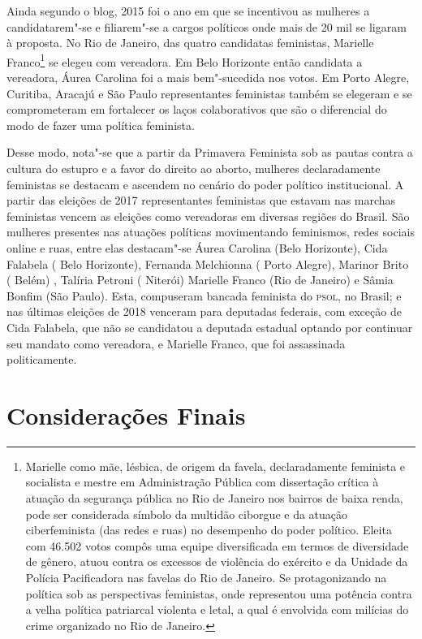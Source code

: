 Ainda segundo o blog, 2015 foi o ano em que se incentivou as mulheres a
candidatarem"-se e filiarem"-se a cargos políticos onde mais de 20 mil se
ligaram à proposta. No Rio de Janeiro, das quatro candidatas feministas,
Marielle Franco\footnote{Marielle como mãe, lésbica, de origem da
  favela, declaradamente feminista e socialista e mestre em
  Administração Pública com dissertação crítica à atuação da segurança
  pública no Rio de Janeiro nos bairros de baixa renda, pode ser
  considerada símbolo da multidão ciborgue e da atuação ciberfeminista
  (das redes e ruas) no desempenho do poder político. Eleita com 46.502
  votos compôs uma equipe diversificada em termos de diversidade de
  gênero, atuou contra os excessos de violência do exército e da Unidade
  da Polícia Pacificadora nas favelas do Rio de Janeiro. Se
  protagonizando na política sob as perspectivas feministas, onde
  representou uma potência contra a velha política patriarcal violenta e
  letal, a qual é envolvida com milícias do crime organizado no Rio de
  Janeiro.} se elegeu com vereadora. Em Belo Horizonte então candidata a
vereadora, Áurea Carolina foi a mais bem"-sucedida nos votos. Em Porto
Alegre, Curitiba, Aracajú e São Paulo representantes feministas também
se elegeram e se comprometeram em fortalecer os laços colaborativos que
são o diferencial do modo de fazer uma política feminista.

Desse modo, nota"-se que a partir da Primavera Feminista sob as pautas
contra a cultura do estupro e a favor do direito ao aborto, mulheres
declaradamente feministas se destacam e ascendem no cenário do poder
político institucional. A partir das eleições de 2017 representantes
feministas que estavam nas marchas feministas vencem as eleições como
vereadoras em diversas regiões do Brasil. São mulheres presentes nas
atuações políticas movimentando feminismos, redes sociais online e ruas,
entre elas destacam"-se Áurea Carolina (Belo Horizonte), Cida Falabela (
Belo Horizonte), Fernanda Melchionna ( Porto Alegre), Marinor Brito (
Belém) , Talíria Petroni ( Niterói) Marielle Franco (Rio de Janeiro) e
Sâmia Bonfim (São Paulo). Esta, compuseram bancada feminista do \textsc{psol}, no
Brasil; e nas últimas eleições de 2018 venceram para deputadas federais,
com exceção de Cida Falabela, que não se candidatou a deputada estadual
optando por continuar seu mandato como vereadora, e Marielle Franco, que
foi assassinada politicamente.

\section{Considerações Finais}

